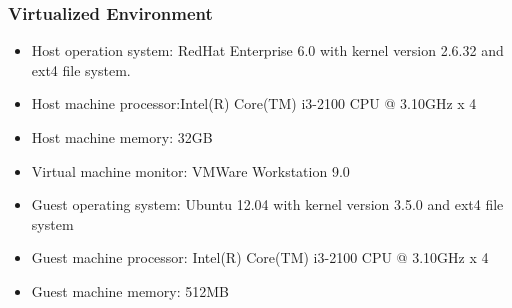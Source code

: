 \subsubsection{Virtualized Environment}
\begin{itemize}
\item{}
Host operation system: RedHat Enterprise 6.0 with kernel version 2.6.32 and ext4 file system. 
\item{}
Host machine processor:Intel(R) Core(TM) i3-2100 CPU @ 3.10GHz x 4
\item{}
Host machine memory: 32GB
\item{}
Virtual machine monitor: VMWare Workstation 9.0
\item{}
Guest operating system: Ubuntu 12.04 with kernel version 3.5.0 and ext4 file system
\item{}
Guest machine processor: Intel(R) Core(TM) i3-2100 CPU @ 3.10GHz x 4
\item{}
Guest machine memory: 512MB
\end{itemize}

